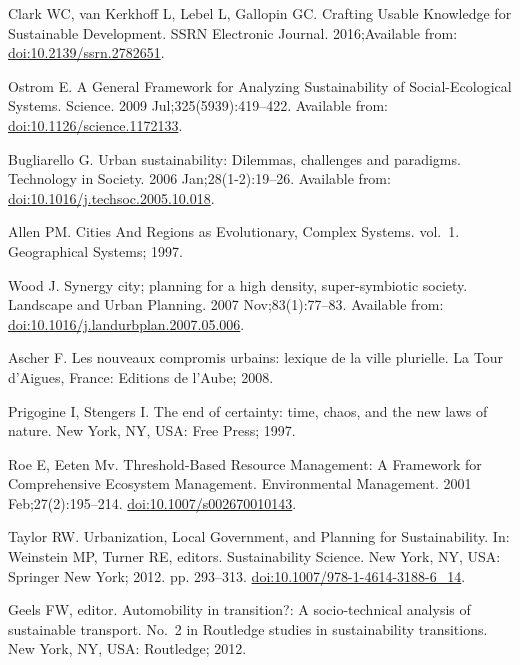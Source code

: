 \documentclass[10pt,a4paper]{article}
\begin{document}
\begin{multicols}{2}
\begin{footnotesize}
\begin{thebibliography}{100}
Clark WC, van Kerkhoff L, Lebel L, Gallopin GC.
\newblock Crafting {Usable} {Knowledge} for {Sustainable} {Development}.
\newblock SSRN Electronic Journal. 2016;Available from:
  \href{https://doi.org/10.2139/ssrn.2782651}{doi:10.2139/ssrn.2782651}.

Ostrom E.
\newblock A {General} {Framework} for {Analyzing} {Sustainability} of
  {Social}-{Ecological} {Systems}.
\newblock Science. 2009 Jul;325(5939):419--422.
\newblock Available from:
  \href{https://doi.org/10.1126/science.1172133}{doi:10.1126/science.1172133}.

Bugliarello G.
\newblock Urban sustainability: {Dilemmas}, challenges and paradigms.
\newblock Technology in Society. 2006 Jan;28(1-2):19--26.
\newblock Available from:
  \href{https://doi.org/10.1016/j.techsoc.2005.10.018}{doi:10.1016/j.techsoc.2005.10.018}.


Allen PM.
\newblock Cities {And} {Regions} as {Evolutionary}, {Complex} {Systems}.
  vol.~1.
\newblock Geographical Systems; 1997.

Wood J.
\newblock Synergy city; planning for a high density, super-symbiotic society.
\newblock Landscape and Urban Planning. 2007 Nov;83(1):77--83.
\newblock Available from:
  \href{https://doi.org/10.1016/j.landurbplan.2007.05.006}{doi:10.1016/j.landurbplan.2007.05.006}.

Ascher F.
\newblock Les nouveaux compromis urbains: lexique de la ville plurielle.
\newblock La Tour d'Aigues, France: Editions de l'Aube; 2008.

Prigogine I, Stengers I.
\newblock The end of certainty: time, chaos, and the new laws of nature.
\newblock New York, NY, USA: Free Press; 1997.

Roe E, Eeten Mv.
\newblock Threshold-{Based} {Resource} {Management}: {A} {Framework} for
  {Comprehensive} {Ecosystem} {Management}.
\newblock Environmental Management. 2001 Feb;27(2):195--214.
  \href{https://doi.org/10.1007/s002670010143}{doi:10.1007/s002670010143}.

Taylor RW.
\newblock Urbanization, {Local} {Government}, and {Planning} for
  {Sustainability}.
\newblock In: Weinstein MP, Turner RE, editors. Sustainability {Science}. New
  York, NY, USA: Springer New York; 2012. pp. 293--313.
\newblock
  \href{https://doi.org/10.1007/978-1-4614-3188-6\_14}{doi:10.1007/978-1-4614-3188-6\_14}.

Geels FW, editor.
\newblock Automobility in transition?: A socio-technical analysis of
  sustainable transport.
\newblock No.~2 in Routledge studies in sustainability transitions. New York,
  NY, USA: Routledge; 2012.

\end{thebibliography}



\end{footnotesize}

\end{multicols}
\end{document}
